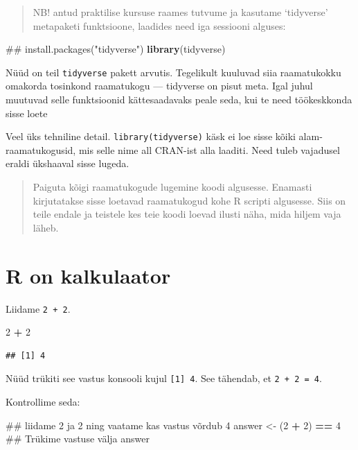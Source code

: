 \documentclass[]{book}
\newenvironment{Shaded}{\begin{snugshade}}{\end{snugshade}}
\newcommand{\KeywordTok}[1]{\textcolor[rgb]{0.13,0.29,0.53}{\textbf{#1}}}
\newcommand{\DecValTok}[1]{\textcolor[rgb]{0.00,0.00,0.81}{#1}}
\newcommand{\StringTok}[1]{\textcolor[rgb]{0.31,0.60,0.02}{#1}}
\newcommand{\OperatorTok}[1]{\textcolor[rgb]{0.81,0.36,0.00}{\textbf{#1}}}
\newcommand{\NormalTok}[1]{#1}
\begin{document}
\begin{quote}
NB! antud praktilise kursuse raames tutvume ja kasutame `tidyverse'
metapaketi funktsioone, laadides need iga sessiooni alguses:
\end{quote}

\begin{Shaded}
\begin{Highlighting}[]
\NormalTok{## install.packages("tidyverse")}
\KeywordTok{library}\NormalTok{(tidyverse)}
\end{Highlighting}
\end{Shaded}

Nüüd on teil \texttt{tidyverse} pakett arvutis. Tegelikult kuuluvad siia
raamatukokku omakorda tosinkond raamatukogu --- tidyverse on pisut meta.
Igal juhul muutuvad selle funktsioonid kättesaadavaks peale seda, kui te
need töökeskkonda sisse loete

Veel üks tehniline detail. \texttt{library(tidyverse)} käsk ei loe sisse
kõiki alam-raamatukogusid, mis selle nime all CRAN-ist alla laaditi.
Need tuleb vajadusel eraldi ükshaaval sisse lugeda.

\begin{quote}
Paiguta kõigi raamatukogude lugemine koodi algusesse. Enamasti
kirjutatakse sisse loetavad raamatukogud kohe R scripti algusesse. Siis
on teile endale ja teistele kes teie koodi loevad ilusti näha, mida
hiljem vaja läheb.
\end{quote}

\chapter{R on kalkulaator}\label{calc}

Liidame \texttt{2\ +\ 2}.

\begin{Shaded}
\begin{Highlighting}[]
\DecValTok{2} \OperatorTok{+}\StringTok{ }\DecValTok{2}
\end{Highlighting}
\end{Shaded}

\begin{verbatim}
## [1] 4
\end{verbatim}

Nüüd trükiti see vastus konsooli kujul \texttt{{[}1{]}\ 4}. See
tähendab, et \texttt{2\ +\ 2\ =\ 4}.

Kontrollime seda:

\begin{Shaded}
\begin{Highlighting}[]
\NormalTok{## liidame 2 ja 2 ning vaatame kas vastus võrdub 4}
\NormalTok{answer <-}\StringTok{ }\NormalTok{(}\DecValTok{2} \OperatorTok{+}\StringTok{ }\DecValTok{2}\NormalTok{) }\OperatorTok{==}\StringTok{ }\DecValTok{4}
\NormalTok{## Trükime vastuse välja}
\NormalTok{answer}
\end{Highlighting}
\end{Shaded}
\end{document}
